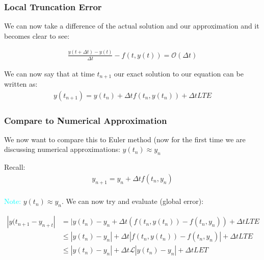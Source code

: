 \documentclass{beamer}
\begin{document}
\begin{frame}
\frametitle{Local Truncation Error} 

We can now take a difference of the actual solution and our approximation and it becomes clear to see: 

\begin{align*}
\frac{y(t+\Delta t) - y(t)}{\Delta t}  - f(t,y(t)) = \mathcal{O}(\Delta t)
\end{align*}

We can now say that at time $t_{n+1}$ our exact solution to our equation can be written as: 
\begin{align*}
y(t_{n+1}) = y(t_n) + \Delta t f(t_n,y(t_n)) + \Delta t LTE 
\end{align*}

 
\end{frame}

\begin{frame}
\frametitle{Compare to Numerical Approximation} 

We now want to compare this to Euler method (now for the first time we are discussing numerical approximations: $ y(t_n) \approx y_{n}$ 

Recall: 
\begin{align*}
y_{n+1} = y_n + \Delta t f(t_n,y_n)
\end{align*}
\ \\
\textcolor{cyan}{Note:} $ y(t_n) \approx y_{n}$. We can now try and evaluate (global error): 

\begin{align*}
| y(t_{n+1} - y_{n+t} | &=  | y(t_n) - y_n + \Delta t (f(t_n,y(t_n)) - f(t_n,y_n)) + \Delta t LTE \\
&\leq | y(t_n) - y_n | + \Delta t | f(t_n,y(t_n)) - f(t_n,y_n) | + \Delta t LTE \\
&\leq | y(t_n) - y_n | +\Delta t \mathcal{L} | y(t_n) - y_n | + \Delta t LET 
\end{align*}

\end{frame}

\end{document}
